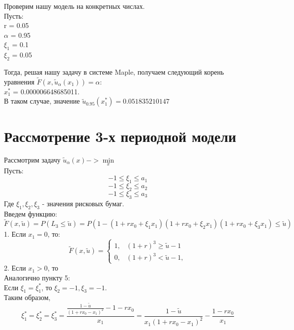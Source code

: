 \documentclass[18pt,a4paper]{article}
\theoremstyle{plain}
\theoremstyle{definition}
\begin{document}
Проверим нашу модель на конкретных числах.\\
Пусть:\\
r = 0.05\\
$\alpha$ = 0.95\\
$\xi_1$ = 0.1\\
$\xi_2$ = 0.05

Тогда, решая нашу задачу в системе Maple, получаем следующий корень уравнения $\tilde{F} (x,\tilde{u}_\alpha(x_1)) = \alpha$:\\
$x_1^*$ = 0.000006648685011.\\
В таком случае, значение $\tilde{u}_{0.95}(x_1^*) = 0.051835210147$

\centering\section{Рассмотрение 3-х периодной модели}

\flushleft



Рассмотрим задачу $\tilde{u}_\alpha(x) -> \min\limits_x$\\
\vspace{1em}
Пусть:
$$
-1\le \xi_1 \le a_1
$$
$$
-1\le \xi_2 \le a_2
$$
$$
-1\le \xi_3 \le a_3
$$
\vspace{1em}
Где $\xi_1,\xi_2,\xi_3$ - значения рисковых бумаг.\\

Введем функцию: $\tilde{F}(x,\tilde{u}) = P(L_3 \le \tilde{u}) = P(1-(1+rx_0+\xi_1 x_1)(1+rx_0+\xi_2 x_1)(1+rx_0+\xi_3 x_1)\le \tilde{u})$\\
\vspace{0.5em}
1. Если $x_1 = 0$, то:\\
$$
\tilde{F}(x,\tilde{u}) =
\left\{\begin{matrix}
1, &(1+r)^3 \ge \tilde{u}-1 \\
0, &(1+r)^3 < \tilde{u}-1,
\end{matrix}\right.
$$
2. Если $x_1 > 0$, то\\



\vspace{0.5em}
Аналогично пункту 5:\\

\vspace{0.5em}
Если $\xi_1 = \xi_1^*$, то $\xi_2 = -1,\xi_3 = -1 $.\\
Таким образом,
$$
\xi_1^* =\xi_2^*=\xi_3^* =\frac{\frac{1-\tilde{u}}{(1+rx_0-x_1)^2} -1 -rx_0}{x_1} = \frac{ 1-\tilde{u} }{ x_1(1+rx_0-x_1)^2 } - \frac{1 -rx_0}{x_1}
$$
\end{document}
